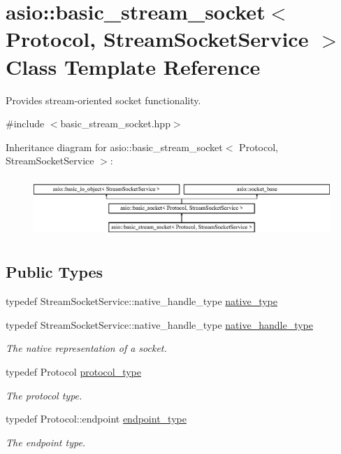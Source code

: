 \hypertarget{classasio_1_1basic__stream__socket}{}\section{asio\+:\+:basic\+\_\+stream\+\_\+socket$<$ Protocol, Stream\+Socket\+Service $>$ Class Template Reference}
\label{classasio_1_1basic__stream__socket}


Provides stream-\/oriented socket functionality.  




{\ttfamily \#include $<$basic\+\_\+stream\+\_\+socket.\+hpp$>$}

Inheritance diagram for asio\+:\+:basic\+\_\+stream\+\_\+socket$<$ Protocol, Stream\+Socket\+Service $>$\+:\begin{figure}[H]
\begin{center}
\leavevmode
\includegraphics[height=2.288828cm]{classasio_1_1basic__stream__socket}
\end{center}
\end{figure}
\subsection*{Public Types}
\begin{DoxyCompactItemize}
\item 
typedef Stream\+Socket\+Service\+::native\+\_\+handle\+\_\+type \hyperlink{classasio_1_1basic__stream__socket_a0e1052ee023a793196175697720dcce2}{native\+\_\+type}
\item 
typedef Stream\+Socket\+Service\+::native\+\_\+handle\+\_\+type \hyperlink{classasio_1_1basic__stream__socket_a3afcab378b90959f1779a74b25e4ad1e}{native\+\_\+handle\+\_\+type}
\begin{DoxyCompactList}\small\item\em The native representation of a socket. \end{DoxyCompactList}\item 
typedef Protocol \hyperlink{classasio_1_1basic__stream__socket_a50b36dfd32d1cca507415b41ab7274d9}{protocol\+\_\+type}
\begin{DoxyCompactList}\small\item\em The protocol type. \end{DoxyCompactList}\item 
typedef Protocol\+::endpoint \hyperlink{classasio_1_1basic__stream__socket_a910d3f9ffa82f284f3fccbecb2f2d3fb}{endpoint\+\_\+type}
\begin{DoxyCompactList}\small\item\em The endpoint type. \end{DoxyCompactList}\end{DoxyCompactItemize}
